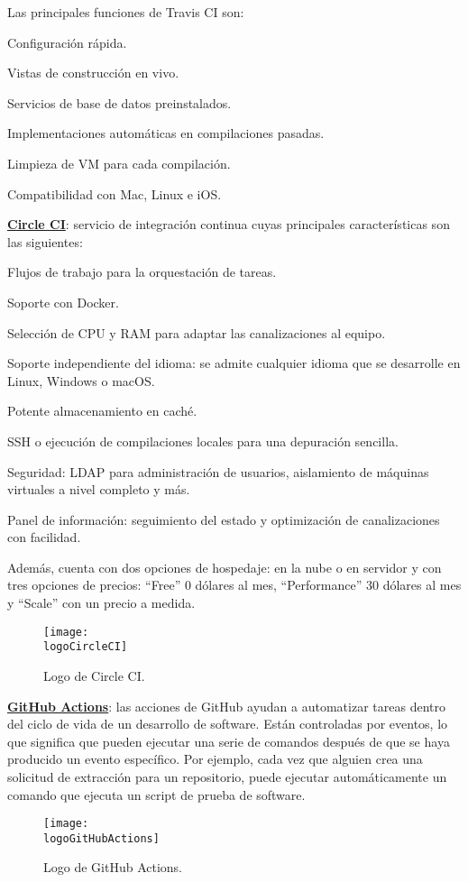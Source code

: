 \begin{compactitem}
    Las principales funciones de Travis CI son:
    \begin{compactitem}
        \item Configuración rápida.
        \item Vistas de construcción en vivo.
        \item Servicios de base de datos preinstalados.
        \item Implementaciones automáticas en compilaciones pasadas.
        \item Limpieza de VM para cada compilación.
        \item Compatibilidad con Mac, Linux e iOS.
    \end{compactitem}
    \item \textbf{\underline{Circle CI}}: servicio de integración continua cuyas principales características son las siguientes:
    \begin{compactitem}
        \item Flujos de trabajo para la orquestación de tareas.
        \item Soporte con Docker.
        \item Selección de CPU y RAM para adaptar las canalizaciones al equipo.
        \item Soporte independiente del idioma: se admite cualquier idioma que se desarrolle en Linux, Windows o macOS.
        \item Potente almacenamiento en caché.
        \item SSH o ejecución de compilaciones locales para una depuración sencilla.
        \item Seguridad: LDAP para administración de usuarios, aislamiento de máquinas virtuales a nivel completo y más.
        \item Panel de información: seguimiento del estado y optimización de canalizaciones con facilidad.
    \end{compactitem}
    Además, cuenta con dos opciones de hospedaje: en la nube o en servidor y con tres opciones de precios: ``Free'' 0 dólares al mes, ``Performance'' 30 dólares al mes y ``Scale'' con un precio a medida.
    \begin{figure}[h]
        \centering
        \texttt{[image: \\logoCircleCI]}
        \caption{Logo de Circle CI.}
    \end{figure}
    \item \textbf{\underline{GitHub Actions}}: las acciones de GitHub ayudan a automatizar tareas dentro del ciclo de vida de un desarrollo de software. Están controladas por eventos, lo que significa que pueden ejecutar una serie de comandos después de que se haya producido un evento específico. Por ejemplo, cada vez que alguien crea una solicitud de extracción para un repositorio, puede ejecutar automáticamente un comando que ejecuta un script de prueba de software.
    \begin{figure}[h]
        \centering
        \texttt{[image: \\logoGitHubActions]}
        \caption{Logo de GitHub Actions.}
    \end{figure}
    

\end{compactitem}

